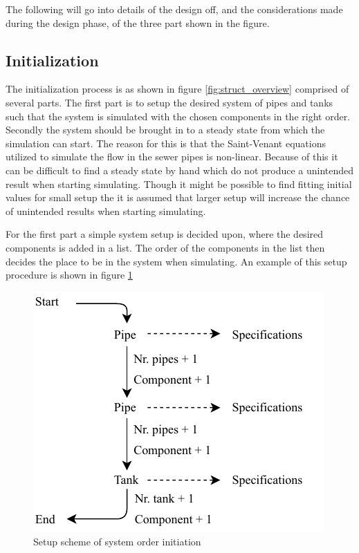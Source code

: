The following will go into details of the design off, and the considerations made during the design phase, of the three part shown in the figure.

\subsection*{Initialization} 
The initialization process is as shown in figure \ref{fig:struct_overview} comprised of several parts. The first part is to setup the desired system of pipes and tanks such that the system is simulated with the chosen components in the right order.
Secondly the system should be brought in to a steady state from which the simulation can start.
The reason for this is that the Saint-Venant equations utilized to simulate the flow in the sewer pipes is non-linear. Because of this it can be difficult to find a steady state by hand which do not produce a unintended result when starting simulating. Though it might be possible to find fitting initial values for small setup the it is assumed that larger setup will increase the chance of unintended results when starting simulating.

For the first part a simple system setup is decided upon, where the desired components is added in a list. The order of the components in the list then decides the place to be in the system when simulating. An example of this  setup procedure is shown in figure \ref{fig:sys_setup}  

\begin{figure}[H]
\centering
\includegraphics[width=0.5 \textwidth]{report/simulation/pictures/sys_setup.pdf}
\caption{Setup scheme of system order initiation}
\label{fig:sys_setup}
\end{figure}

